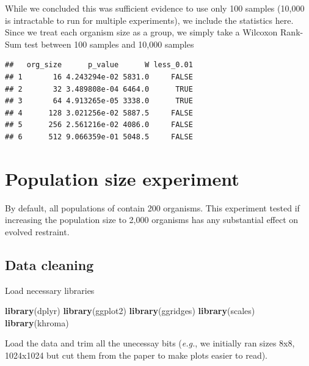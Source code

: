 \documentclass[]{book}
\newenvironment{Shaded}{\begin{snugshade}}{\end{snugshade}}
\newcommand{\KeywordTok}[1]{\textcolor[rgb]{0.13,0.29,0.53}{\textbf{#1}}}
\newcommand{\NormalTok}[1]{#1}
\begin{document}
While we concluded this was sufficient evidence to use only 100 samples (10,000 is intractable to run for multiple experiments), we include the statistics here.
Since we treat each organism size as a group, we simply take a Wilcoxon Rank-Sum test between 100 samples and 10,000 samples

\begin{verbatim}
##   org_size      p_value      W less_0.01
## 1       16 4.243294e-02 5831.0     FALSE
## 2       32 3.489808e-04 6464.0      TRUE
## 3       64 4.913265e-05 3338.0      TRUE
## 4      128 3.021256e-02 5887.5     FALSE
## 5      256 2.561216e-02 4086.0     FALSE
## 6      512 9.066359e-01 5048.5     FALSE
\end{verbatim}

\hypertarget{population-size-experiment}{%
\chapter{Population size experiment}\label{population-size-experiment}}

By default, all populations of contain 200 organisms.
This experiment tested if increasing the population size to 2,000 organisms has any substantial effect on evolved restraint.

\hypertarget{data-cleaning-3}{%
\section{Data cleaning}\label{data-cleaning-3}}

Load necessary libraries

\begin{Shaded}
\begin{Highlighting}[]
\KeywordTok{library}\NormalTok{(dplyr)}
\KeywordTok{library}\NormalTok{(ggplot2)}
\KeywordTok{library}\NormalTok{(ggridges)}
\KeywordTok{library}\NormalTok{(scales)}
\KeywordTok{library}\NormalTok{(khroma)}
\end{Highlighting}
\end{Shaded}

Load the data and trim all the unecessay bits (\emph{e.g.}, we initially ran sizes 8x8, 1024x1024 but cut them from the paper to make plots easier to read).
\end{document}
